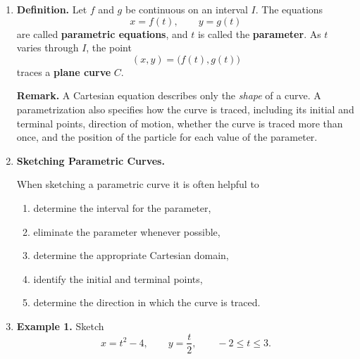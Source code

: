 \documentclass[11pt,letterpaper]{article}
\newenvironment{solution}
  {\par\medskip\noindent\textbf{Solution.}\par\smallskip}
  {\par\medskip}
\begin{document}
\begin{enumerate}
\begin{enumerate}
\begin{solution}
The ball returns to ground level when
\[
-16t^2+24\sqrt{2}\,t=0,
\]
so
\[
t(-16t+24\sqrt{2})=0.
\]
Hence
\[
t=0
\quad\text{or}\quad
t=\frac{3\sqrt{2}}{2}.
\]
Thus the flight lasts \(\frac{3\sqrt{2}}{2}\) seconds.
\end{solution}

\item Verify that eliminating \(t\) produces the original Cartesian equation.

\begin{solution}
From
\[
x=24\sqrt{2}\,t,
\]
we obtain
\[
t=\frac{x}{24\sqrt{2}}.
\]
Substitute this into \(y\):
\[
y=-16\left(\frac{x}{24\sqrt{2}}\right)^2
  +24\sqrt{2}\left(\frac{x}{24\sqrt{2}}\right).
\]
Since
\[
\left(24\sqrt{2}\right)^2=1152,
\]
we get
\[
y=-\frac{16x^2}{1152}+x
  =-\frac{x^2}{72}+x.
\]
\end{solution}
\end{enumerate}

\item \textbf{Definition.}
Let \(f\) and \(g\) be continuous on an interval \(I\). The equations
\[
x=f(t),\qquad y=g(t)
\]
are called \textbf{parametric equations}, and \(t\) is called the \textbf{parameter}.
As \(t\) varies through \(I\), the point
\[
(x,y)=\bigl(f(t),g(t)\bigr)
\]
traces a \textbf{plane curve} \(C\).

\textbf{Remark.} A Cartesian equation describes only the \emph{shape} of a curve. A parametrization also specifies how the curve is traced, including its initial and terminal points, direction of motion, whether the curve is traced more than once, and the position of the particle for each value of the parameter.

\item \textbf{Sketching Parametric Curves.}

When sketching a parametric curve it is often helpful to
\begin{enumerate}
\item determine the interval for the parameter,
\item eliminate the parameter whenever possible,
\item determine the appropriate Cartesian domain,
\item identify the initial and terminal points,
\item determine the direction in which the curve is traced.
\end{enumerate}

\item \textbf{Example 1.}
Sketch
\[
x=t^2-4,\qquad y=\frac{t}{2},
\qquad -2\le t\le 3.
\]


\end{enumerate}
\end{document}
